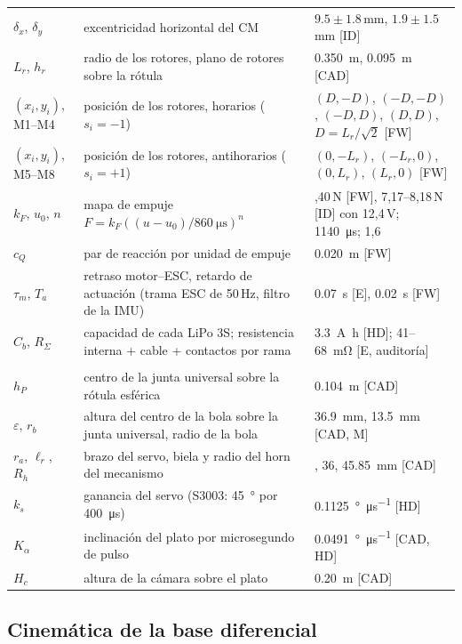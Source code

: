 \begin{small}
\begin{longtable}{@{}>{\raggedright\arraybackslash}p{}>{\raggedright\arraybackslash}p{}>{\raggedleft\arraybackslash}p{}@{}}
$\delta_x$, $\delta_y$ & excentricidad horizontal del CM & $9.5\pm1.8$\,mm, $1.9\pm1.5$\,mm [ID] \\
$L_r$, $h_r$ & radio de los rotores, plano de rotores sobre la rótula & \SI{0.350}{\metre}, \SI{0.095}{\metre} [CAD] \\
$(x_i,y_i)$, M1--M4 & posición de los rotores, horarios ($s_i=-1$) & $(D,-D)$, $(-D,-D)$, $(-D,D)$, $(D,D)$, $D=L_r/\sqrt2$ [FW] \\
$(x_i,y_i)$, M5--M8 & posición de los rotores, antihorarios ($s_i=+1$) & $(0,-L_r)$, $(-L_r,0)$, $(0,L_r)$, $(L_r,0)$ [FW] \\
$k_F$, $u_0$, $n$ & mapa de empuje $F=k_F((u-u_0)/\SI{860}{\micro\second})^n$ & 5,40\,N [FW], 7,17--8,18\,N [ID] con 12,4\,V; \SI{1140}{\micro\second}; 1,6 \\
$c_Q$ & par de reacción por unidad de empuje & \SI{0.020}{\metre} [FW] \\
$\tau_m$, $T_a$ & retraso motor--ESC, retardo de actuación (trama ESC de 50\,Hz, filtro de la IMU) & \SI{0.07}{\second} [E], \SI{0.02}{\second} [FW] \\
$C_b$, $R_\Sigma$ & capacidad de cada LiPo 3S; resistencia interna + cable + contactos por rama & \SI{3.3}{\ampere\hour} [HD]; 41--\SI{68}{\milli\ohm} [E, auditoría] \\
\midrule
\multicolumn{3}{@{}l}{\emph{\textit{Ball and plate}}}\\
$h_P$ & centro de la junta universal sobre la rótula esférica & \SI{0.104}{\metre} [CAD] \\
$\varepsilon$, $r_b$ & altura del centro de la bola sobre la junta universal, radio de la bola & \SI{36.9}{\milli\metre}, \SI{13.5}{\milli\metre} [CAD, M] \\
$r_a$, $\ell_r$, $R_h$ & brazo del servo, biela y radio del horn del mecanismo & 20, 36, \SI{45.85}{\milli\metre} [CAD] \\
$k_s$ & ganancia del servo (S3003: \SI{45}{\degree} por \SI{400}{\micro\second}) & \SI{0.1125}{\degree\per\micro\second} [HD] \cite{futaba_s3003} \\
$K_\alpha$ & inclinación del plato por microsegundo de pulso & \SI{0.0491}{\degree\per\micro\second} [CAD, HD] \\
$H_c$ & altura de la cámara sobre el plato & \SI{0.20}{\metre} [CAD] \\
\bottomrule
\end{longtable}
\end{small}

\subsection{Cinemática de la base diferencial}
\label{sec:basekin}

